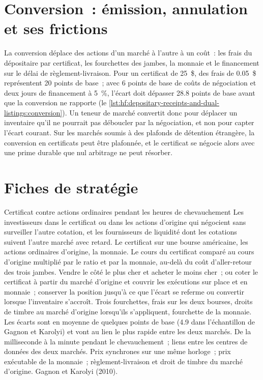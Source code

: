 \section{Conversion~: émission, annulation et ses frictions}

La conversion déplace des actions d'un marché à l'autre à un coût~: les frais du dépositaire par certificat, les fourchettes des jambes, la monnaie et le financement sur le
délai de règlement-livraison. Pour un certificat de 25~\$, des frais de 0.05~\$ représentent 20 points de base~; avec 6 points de base de coûts de négociation et deux jours de financement à 5~\%, l'écart doit
dépasser 28.8 points de base avant que la conversion ne rapporte (le \cref{lst:hf:depositary-receipts-and-dual-listings:conversion}). Un teneur de marché convertit donc
pour déplacer un inventaire qu'il ne pourrait pas déboucler par la négociation, et non pour capter l'écart courant. Sur les marchés soumis à des plafonds de détention étrangère, la conversion en
certificats peut être plafonnée, et le certificat se négocie alors avec une prime durable que nul arbitrage ne peut résorber.

\section{Fiches de stratégie}

\begin{strategyfile}{Certificat contre actions ordinaires pendant les heures de chevauchement}\label{strat:hf:depositary-receipts-and-dual-listings:overlap}
 Les investisseurs dans le certificat ou dans les actions d'origine qui négocient sans surveiller l'autre cotation, et les fournisseurs de liquidité
dont les cotations suivent l'autre marché avec retard.
 Le certificat sur une bourse américaine, les actions ordinaires d'origine, la monnaie.
 Le cours du certificat comparé au cours d'origine multiplié par le ratio et par la monnaie, au-delà du coût d'aller-retour des trois jambes.
 Vendre le côté le plus cher et acheter le moins cher~; ou coter le certificat à partir du marché d'origine et couvrir les exécutions sur place et en
monnaie~; conserver la position jusqu'à ce que l'écart se referme ou convertir lorsque l'inventaire s'accroît.
 Trois fourchettes, frais sur les deux bourses, droits de timbre au marché d'origine lorsqu'ils s'appliquent, fourchette de la monnaie.
 Les écarts sont en moyenne de quelques points de base (4.9 dans l'échantillon de Gagnon et Karolyi) et vont au lien le plus rapide entre les deux marchés.
 De la milliseconde à la minute pendant le chevauchement~; liens entre les centres de données des deux marchés.
 Prix synchrones sur une même horloge~; prix exécutable de la monnaie~; règlement-livraison et droit de timbre du marché d'origine.
 Gagnon et Karolyi (2010).
\end{strategyfile}

